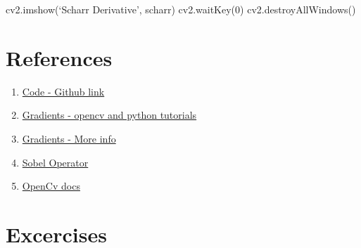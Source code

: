 \documentclass[]{article}
\newenvironment{Shaded}{}{}
\newcommand{\DecValTok}[1]{\textcolor[rgb]{0.25,0.63,0.44}{{#1}}}
\newcommand{\NormalTok}[1]{{#1}}
\begin{document}
\begin{itemize}
\begin{Shaded}
\begin{Highlighting}[]
\NormalTok{cv2.imshow(‘Scharr Derivative’, scharr)}
\NormalTok{cv2.waitKey(}\DecValTok{0}\NormalTok{)}
\NormalTok{cv2.destroyAllWindows()}
\end{Highlighting}
\end{Shaded}
\end{itemize}

\section{References}\label{references}

\begin{enumerate}
\def\labelenumi{\arabic{enumi}.}
\item \href{https://github.com/eyantrainternship/eYSIP_2015_Marker_based_Robot_Localisation/blob/master/Task-3/Gradients/src/gradients.py}{Code - Github link}

\item
  \href{http://opencv-python-tutroals.readthedocs.org/en/latest/py\_tutorials/py\_imgproc
  /py\_gradients/py\_gradients.html}{Gradients - opencv and python tutorials}
\item
  \href{http://www.bogotobogo.com/python/OpenCV\_Python/python\_opencv3\_Image\_Gradient
  \_Sobel\_Laplacian\_Derivatives\_Edge\_Detection.php}{Gradients - More info}
\item
  \href{http://en.wikipedia.org/wiki/Sobel\_operator}{Sobel Operator}
\item
  \href{http://docs.opencv.org/doc/tutorials/imgproc/imgtrans/sobel
  \_derivatives/sobel\_derivatives.html}{OpenCv docs}
\end{enumerate}

\section{Excercises}\label{excercises}
\end{document}
